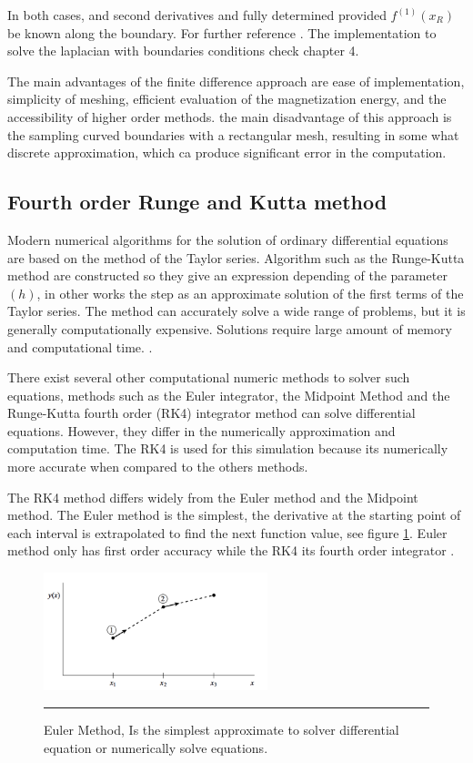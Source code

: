 In both cases, and second derivatives and fully determined provided $f^{(1)}(x_R)$ be known along the boundary. For further reference \cite{methods}. The implementation to solve the laplacian with boundaries conditions check chapter 4.

The main advantages of the finite difference approach are ease of implementation, simplicity of meshing, efficient evaluation of the magnetization energy, and the accessibility of higher order methods. the main disadvantage of this approach is the sampling curved boundaries with a rectangular mesh, resulting in some what discrete  approximation, which ca produce significant error in the computation.

\subsection{Fourth order Runge and Kutta method}

 Modern numerical algorithms for the solution of ordinary differential equations are based on the method of the Taylor series. Algorithm such as the Runge-Kutta method are constructed so they give an expression depending of the parameter $(h)$, in other works the step as an approximate solution of the first terms of the Taylor series. The method can accurately solve a wide range of problems, but it is generally computationally expensive. Solutions require large amount of memory and computational time. \cite{numerical}.

There exist several other computational numeric methods to solver such equations, methods such as the Euler integrator, the Midpoint Method and the Runge-Kutta fourth order (RK4) integrator method can solve differential equations. However, they differ in the numerically approximation and computation time. The RK4 is used for this simulation because its numerically more accurate when compared to the others methods.

The RK4 method differs widely from the Euler method and the Midpoint method. The Euler method is the simplest, the derivative at the starting point of each interval is extrapolated to find the next function value, see figure \ref{fig:euler}. Euler method only has first order accuracy while the RK4 its fourth order integrator \cite{numerical}.

\begin{figure}[htbp]
	\centering
		\includegraphics[width=0.58\textwidth]{Figures/euler.png}
		\rule{35em}{0.4pt}
	\caption[Euler Method]{Euler Method, Is the simplest approximate to solver differential equation or numerically solve equations.}
	\label{fig:euler}
\end{figure}

